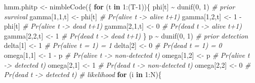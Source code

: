 \documentclass[
  12pt,
]{krantz}
\newenvironment{Shaded}{\begin{snugshade}}{\end{snugshade}}
\newcommand{\CommentTok}[1]{\textcolor[rgb]{0.56,0.35,0.01}{\textit{#1}}}
\newcommand{\ControlFlowTok}[1]{\textcolor[rgb]{0.13,0.29,0.53}{\textbf{#1}}}
\newcommand{\DecValTok}[1]{\textcolor[rgb]{0.00,0.00,0.81}{#1}}
\newcommand{\FunctionTok}[1]{\textcolor[rgb]{0.00,0.00,0.00}{#1}}
\newcommand{\NormalTok}[1]{#1}
\newcommand{\OtherTok}[1]{\textcolor[rgb]{0.56,0.35,0.01}{#1}}
\newcommand{\SpecialCharTok}[1]{\textcolor[rgb]{0.00,0.00,0.00}{#1}}
\begin{document}
\begin{Shaded}
\begin{Highlighting}[]
\NormalTok{hmm.phitp }\OtherTok{\textless{}{-}} \FunctionTok{nimbleCode}\NormalTok{(\{}
  \ControlFlowTok{for}\NormalTok{ (t }\ControlFlowTok{in} \DecValTok{1}\SpecialCharTok{:}\NormalTok{(T}\DecValTok{{-}1}\NormalTok{))\{}
\NormalTok{    phi[t] }\SpecialCharTok{\textasciitilde{}} \FunctionTok{dunif}\NormalTok{(}\DecValTok{0}\NormalTok{, }\DecValTok{1}\NormalTok{) }\CommentTok{\# prior survival}
\NormalTok{    gamma[}\DecValTok{1}\NormalTok{,}\DecValTok{1}\NormalTok{,t] }\OtherTok{\textless{}{-}}\NormalTok{ phi[t]      }\CommentTok{\# Pr(alive t {-}\textgreater{} alive t+1)}
\NormalTok{    gamma[}\DecValTok{1}\NormalTok{,}\DecValTok{2}\NormalTok{,t] }\OtherTok{\textless{}{-}} \DecValTok{1} \SpecialCharTok{{-}}\NormalTok{ phi[t]  }\CommentTok{\# Pr(alive t {-}\textgreater{} dead t+1)}
\NormalTok{    gamma[}\DecValTok{2}\NormalTok{,}\DecValTok{1}\NormalTok{,t] }\OtherTok{\textless{}{-}} \DecValTok{0}        \CommentTok{\# Pr(dead t {-}\textgreater{} alive t+1)}
\NormalTok{    gamma[}\DecValTok{2}\NormalTok{,}\DecValTok{2}\NormalTok{,t] }\OtherTok{\textless{}{-}} \DecValTok{1}        \CommentTok{\# Pr(dead t {-}\textgreater{} dead t+1)}
\NormalTok{  \}}
\NormalTok{  p }\SpecialCharTok{\textasciitilde{}} \FunctionTok{dunif}\NormalTok{(}\DecValTok{0}\NormalTok{, }\DecValTok{1}\NormalTok{) }\CommentTok{\# prior detection}
\NormalTok{  delta[}\DecValTok{1}\NormalTok{] }\OtherTok{\textless{}{-}} \DecValTok{1}          \CommentTok{\# Pr(alive t = 1) = 1}
\NormalTok{  delta[}\DecValTok{2}\NormalTok{] }\OtherTok{\textless{}{-}} \DecValTok{0}          \CommentTok{\# Pr(dead t = 1) = 0}
\NormalTok{  omega[}\DecValTok{1}\NormalTok{,}\DecValTok{1}\NormalTok{] }\OtherTok{\textless{}{-}} \DecValTok{1} \SpecialCharTok{{-}}\NormalTok{ p    }\CommentTok{\# Pr(alive t {-}\textgreater{} non{-}detected t)}
\NormalTok{  omega[}\DecValTok{1}\NormalTok{,}\DecValTok{2}\NormalTok{] }\OtherTok{\textless{}{-}}\NormalTok{ p        }\CommentTok{\# Pr(alive t {-}\textgreater{} detected t)}
\NormalTok{  omega[}\DecValTok{2}\NormalTok{,}\DecValTok{1}\NormalTok{] }\OtherTok{\textless{}{-}} \DecValTok{1}        \CommentTok{\# Pr(dead t {-}\textgreater{} non{-}detected t)}
\NormalTok{  omega[}\DecValTok{2}\NormalTok{,}\DecValTok{2}\NormalTok{] }\OtherTok{\textless{}{-}} \DecValTok{0}        \CommentTok{\# Pr(dead t {-}\textgreater{} detected t)}
  \CommentTok{\# likelihood}
  \ControlFlowTok{for}\NormalTok{ (i }\ControlFlowTok{in} \DecValTok{1}\SpecialCharTok{:}\NormalTok{N)\{}

\end{Highlighting}
\end{Shaded}
\end{document}
